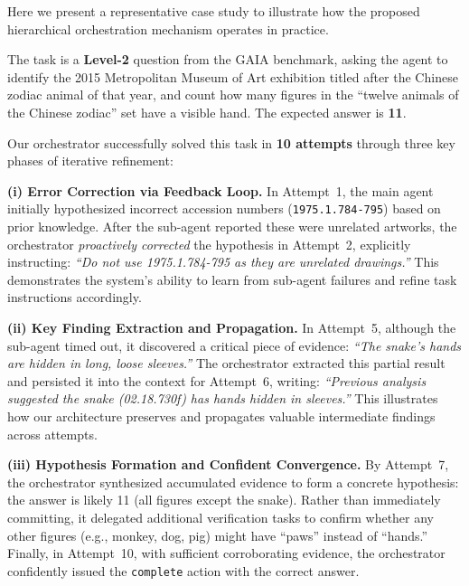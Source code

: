%


Here we present a representative case study to illustrate how the proposed hierarchical orchestration mechanism operates in practice.

The task is a \textbf{Level-2} question from the GAIA benchmark, asking the agent to identify the 2015 Metropolitan Museum of Art exhibition titled after the Chinese zodiac animal of that year, and count how many figures in the ``twelve animals of the Chinese zodiac'' set have a visible hand. The expected answer is \textbf{11}.

Our orchestrator successfully solved this task in \textbf{10 attempts} through three key phases of iterative refinement:

\textbf{(i) Error Correction via Feedback Loop.} 
In Attempt~1, the main agent initially hypothesized incorrect accession numbers (\texttt{1975.1.784-795}) based on prior knowledge. After the sub-agent reported these were unrelated artworks, the orchestrator \emph{proactively corrected} the hypothesis in Attempt~2, explicitly instructing: \emph{``Do not use 1975.1.784-795 as they are unrelated drawings.''} This demonstrates the system's ability to learn from sub-agent failures and refine task instructions accordingly.

\textbf{(ii) Key Finding Extraction and Propagation.} 
In Attempt~5, although the sub-agent timed out, it discovered a critical piece of evidence: \emph{``The snake's hands are hidden in long, loose sleeves.''} The orchestrator extracted this partial result and persisted it into the context for Attempt~6, writing: \emph{``Previous analysis suggested the snake (02.18.730f) has hands hidden in sleeves.''} This illustrates how our architecture preserves and propagates valuable intermediate findings across attempts.

\textbf{(iii) Hypothesis Formation and Confident Convergence.} 
By Attempt~7, the orchestrator synthesized accumulated evidence to form a concrete hypothesis: the answer is likely 11 (all figures except the snake). Rather than immediately committing, it delegated additional verification tasks to confirm whether any other figures (e.g., monkey, dog, pig) might have ``paws'' instead of ``hands.'' Finally, in Attempt~10, with sufficient corroborating evidence, the orchestrator confidently issued the \texttt{complete} action with the correct answer.



